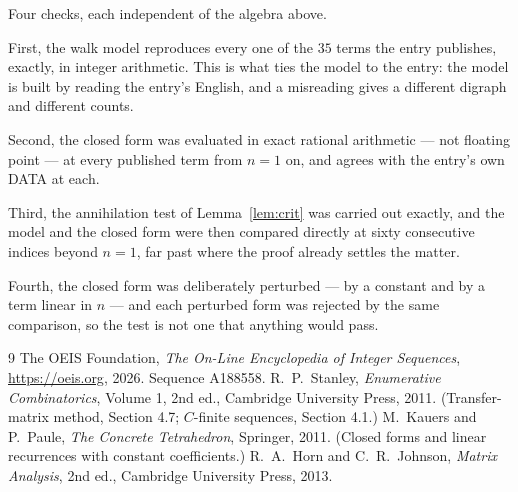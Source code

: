 \documentclass[11pt,a4paper]{article}
\theoremstyle{plain}
\theoremstyle{definition}
\begin{document}
Four checks, each independent of the algebra above.

First, the walk model reproduces every one of the $35$ terms the entry publishes,
exactly, in integer arithmetic. This is what ties the model to the entry: the model is built
by reading the entry's English, and a misreading gives a different digraph and different
counts.

Second, the closed form was evaluated in exact rational arithmetic --- not floating point ---
at every published term from $n=1$ on, and agrees with the entry's own DATA at each.

Third, the annihilation test of Lemma~\ref{lem:crit} was carried out exactly, and the model
and the closed form were then compared directly at sixty consecutive indices beyond
$n=1$, far past where the proof already settles the matter.

Fourth, the closed form was deliberately perturbed --- by a constant and by a term linear in
$n$ --- and each perturbed form was rejected by the same comparison, so the test is not one
that anything would pass.

\begin{thebibliography}{9}
 The OEIS Foundation, \emph{The On-Line Encyclopedia of Integer
Sequences}, \url{https://oeis.org}, 2026. Sequence A188558.
 R.~P.~Stanley, \emph{Enumerative Combinatorics}, Volume 1, 2nd ed.,
Cambridge University Press, 2011. (Transfer-matrix method, Section 4.7; $C$-finite sequences,
Section 4.1.)
 M.~Kauers and P.~Paule, \emph{The Concrete Tetrahedron}, Springer, 2011.
(Closed forms and linear recurrences with constant coefficients.)
 R.~A.~Horn and C.~R.~Johnson, \emph{Matrix Analysis}, 2nd ed., Cambridge
University Press, 2013.
\end{thebibliography}
\end{document}
